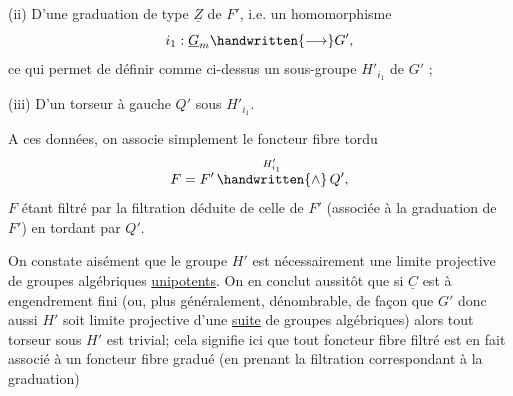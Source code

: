 (ii) D'une graduation de type $\underline{Z}$ de $F'$, i.e. un homomorphisme
\[
i_1:\underline{G}_m\handwritten{\longrightarrow}G',
\]
ce qui permet de définir comme ci-dessus un sous-groupe $H'_{i_1}$ de $G'$ ;

(iii) D'un torseur à gauche $Q'$ sous $H'_{i_1}$.

A ces données, on associe simplement le foncteur fibre tordu
\[
F=F'\mathop{\handwritten{\wedge}}\limits^{H'_{i_1}}Q',
\]
$F$ étant filtré par la filtration déduite de celle de $F'$  (associée à la graduation de $F'$) en tordant par $Q'$.


On constate aisément que le groupe $H'$ est nécessairement une limite projective de groupes algébriques \uline{unipotents}. On en conclut aussitôt que si $\underline{C}$ est à engendrement fini (ou, plus généralement,  dénombrable, de façon que $G'$  donc aussi $H'$ soit limite projective d'une \uline{suite} de groupes algébriques) alors tout torseur sous $H'$ est trivial; cela signifie ici que tout foncteur fibre filtré est en fait associé à un foncteur fibre gradué (en prenant la filtration correspondant à la graduation)

